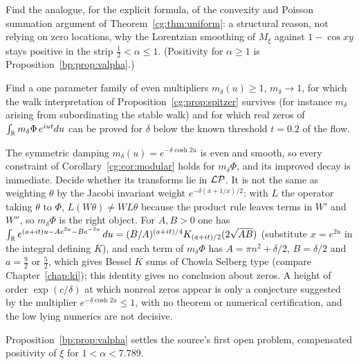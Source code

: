 \begin{problem}\label{cg:prob:explicit}
Find the analogue, for the explicit formula, of the convexity and Poisson summation argument of Theorem~\ref{cg:thm:uniform}: a structural reason, not relying on zero locations, why the Lorentzian smoothing of $M_\xi$ against $1-\cos xy$ stays positive in the strip $\frac12<\alpha\le1$. (Positivity for $\alpha\ge1$ is Proposition~\ref{bp:prop:valpha}.)
\end{problem}

\begin{problem}\label{cg:prob:multiplier}
Find a one parameter family of even multipliers $m_\delta(u)\ge1$, $m_\delta\to1$, for which the walk interpretation of Proposition~\ref{cg:prop:spitzer} survives (for instance $m_\delta$ arising from subordinating the stable walk) and for which real zeros of $\int_{\mathbb{R}} m_\delta\Phi\,e^{iut}du$ can be proved for $\delta$ below the known threshold $t=0.2$ of the flow.
\end{problem}

\begin{problem}\label{cg:prob:cosh}
The symmetric damping $m_\delta(u)=e^{-\delta\cosh2u}$ is even and smooth, so every constraint of Corollary~\ref{cg:cor:modular} holds for $m_\delta\Phi$, and its improved decay is immediate. Decide whether its transforms lie in $\mathcal{L}\mathcal{P}$. It is not the same as weighting $\theta$ by the Jacobi invariant weight $e^{-\delta(x+1/x)/2}$: with $L$ the operator taking $\theta$ to $\Phi$, $L(W\theta)\neq WL\theta$ because the product rule leaves terms in $W'$ and $W''$, so $m_\delta\Phi$ is the right object. For $A,B>0$ one has $\int_{\mathbb{R}} e^{(a+it)u-Ae^{2u}-Be^{-2u}}\,du=(B/A)^{(a+it)/4}K_{(a+it)/2}(2\sqrt{AB})$ (substitute $x=e^{2u}$ in the integral defining $K$), and each term of $m_\delta\Phi$ has $A=\pi n^2+\delta/2$, $B=\delta/2$ and $a=\frac92$ or $\frac52$, which gives Bessel $K$ sums of Chowla Selberg type (compare Chapter~\ref{chap:ki}); this identity gives no conclusion about zeros. A height of order $\exp(c/\delta)$ at which nonreal zeros appear is only a conjecture suggested by the multiplier $e^{-\delta\cosh2u}\le1$, with no theorem or numerical certification, and the low lying numerics are not decisive.
\end{problem}

Proposition~\ref{bp:prop:valpha} settles the source's first open problem, compensated positivity of $\xi$ for $1<\alpha<7.789$.
